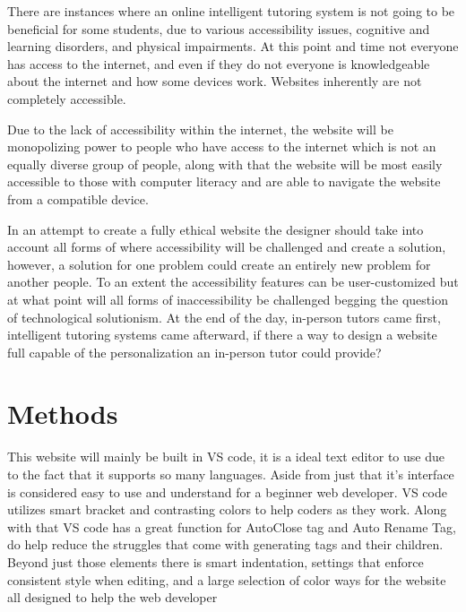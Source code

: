 \documentclass[10pt,twocolumn]{article}
\begin{document}
There are instances where an online intelligent tutoring system is not going to be beneficial for some students, due to various accessibility issues, cognitive and learning disorders, and physical impairments. At this point and time not everyone has access to the internet, and even if they do not everyone is knowledgeable about the internet and how some devices work. Websites inherently are not completely accessible.

Due to the lack of accessibility within the internet, the website will be monopolizing power to people who have access to the internet which is not an equally diverse group of people, along with that the website will be most easily accessible to those with computer literacy and are able to navigate the website from a compatible device. 

In an attempt to create a fully ethical website the designer should take into account all forms of where accessibility will be challenged and create a solution, however, a solution for one problem could create an entirely new problem for another people. To an extent the accessibility features can be user-customized but at what point will all forms of inaccessibility be challenged begging the question of technological solutionism. At the end of the day, in-person tutors came first, intelligent tutoring systems came afterward, if there a way to design a website full capable of the personalization an in-person tutor could provide?

\section{Methods}
This website will mainly be built in VS code, it is a ideal text editor to use due to the fact that it supports so many languages. Aside from just that it's interface is considered easy to use and understand for a beginner web developer. VS code utilizes smart bracket and contrasting colors to help coders as they work. Along with that VS code has a great function for AutoClose tag and Auto Rename Tag, do help reduce the struggles that come with generating tags and their children. Beyond just those elements there is smart indentation, settings that enforce consistent style when editing, and a large selection of color ways for the website all designed to help the web developer  \cite{gupta_vs_2019}
\end{document}
